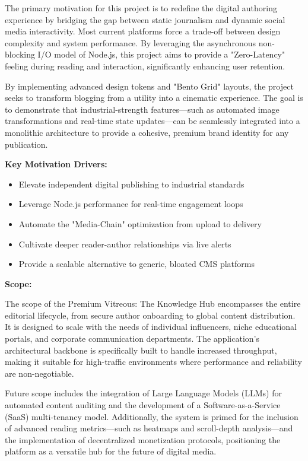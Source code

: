 \documentclass[12pt,a4paper]{report}
\begin{document}
The primary motivation for this project is to redefine the digital authoring experience by bridging the gap between static journalism and dynamic social media interactivity. Most current platforms force a trade-off between design complexity and system performance. By leveraging the asynchronous non-blocking I/O model of Node.js, this project aims to provide a "Zero-Latency" feeling during reading and interaction, significantly enhancing user retention.

By implementing advanced design tokens and "Bento Grid" layouts, the project seeks to transform blogging from a utility into a cinematic experience. The goal is to demonstrate that industrial-strength features—such as automated image transformations and real-time state updates—can be seamlessly integrated into a monolithic architecture to provide a cohesive, premium brand identity for any publication.

\textbf{Key Motivation Drivers:}
\begin{itemize}
    \item Elevate independent digital publishing to industrial standards
    \item Leverage Node.js performance for real-time engagement loops
    \item Automate the "Media-Chain" optimization from upload to delivery
    \item Cultivate deeper reader-author relationships via live alerts
    \item Provide a scalable alternative to generic, bloated CMS platforms
\end{itemize}

\textbf{Scope:}

The scope of the Premium Vitreous: The Knowledge Hub encompasses the entire editorial lifecycle, from secure author onboarding to global content distribution. It is designed to scale with the needs of individual influencers, niche educational portals, and corporate communication departments. The application’s architectural backbone is specifically built to handle increased throughput, making it suitable for high-traffic environments where performance and reliability are non-negotiable.

Future scope includes the integration of Large Language Models (LLMs) for automated content auditing and the development of a Software-as-a-Service (SaaS) multi-tenancy model. Additionally, the system is primed for the inclusion of advanced reading metrics—such as heatmaps and scroll-depth analysis—and the implementation of decentralized monetization protocols, positioning the platform as a versatile hub for the future of digital media.
\end{document}

